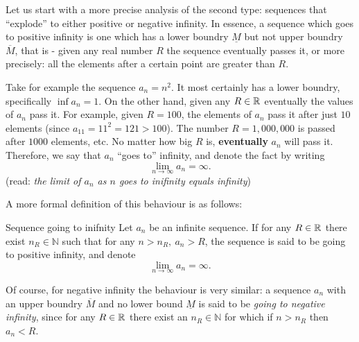 Let us start with a more precise analysis of the second type: sequences that ``explode'' to either positive or negative infinity. In essence, a sequence which goes to positive infinity is one which has a lower boundry $\underline{M}$ but not upper boundry $\overline{M}$, that is - given any real number $R$ the sequence eventually passes it, or more precisely: all the elements after a certain point are greater than $R$.

Take for example the sequence $a_{n}=n^{2}$. It most certainly has a lower boundry, specifically $\inf a_{n}=1$. On the other hand, given any $R\in\mathbb{R}^{}$ eventually the values of $a_{n}$ pass it. For example, given $R=100$, the elements of $a_{n}$ pass it after just $10$ elements (since $a_{11}=11^{2}=121>100$). The number $R=1,000,000$ is passed after $1000$ elements, etc. No matter how big $R$ is, \textbf{eventually} $a_{n}$ will pass it. Therefore, we say that $a_{n}$ ``goes to'' infinity, and denote the fact by writing
\begin{equation}
	\lim\limits_{n\to\infty}a_{n}=\infty.
\end{equation}
(read: \textit{the limit of $a_{n}$ as $n$ goes to inifinity equals infinity})

A more formal definition of this behaviour is as follows:
\begin{definition}{Sequence going to inifnity}{}
	Let $a_{n}$ be an infinite sequence. If for any $R\in\mathbb{R}^{}$ there exist $n_{R}\in\mathbb{N}$ such that for any $n>n_{R},\ a_{n}>R$, the sequence is said to be going to positive infinity, and denote
\[
	\lim\limits_{n\to\infty}a_{n}=\infty.
\]
\end{definition}

Of course, for negative infinity the behaviour is very similar: a sequence $a_{n}$ with an upper boundry $\overline{M}$ and no lower bound $\underline{M}$ is said to be \emph{going to negative infinity}, since for any $R\in\mathbb{R}^{}$ there exist an $n_{R}\in\mathbb{N}$ for which if $n>n_{R}$ then $a_{n}<R$.
